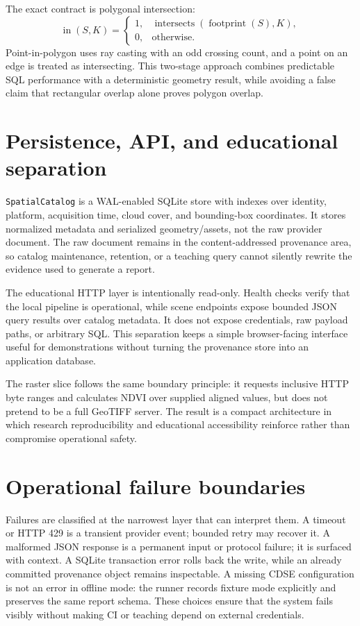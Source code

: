 The exact contract is polygonal intersection:
\[
\operatorname{in}(S,K)=
\begin{cases}
1,&\operatorname{intersects}(\operatorname{footprint}(S),K),\\
0,&\text{otherwise}.
\end{cases}
\]
Point-in-polygon uses ray casting with an odd crossing count, and a point on an edge is treated as
intersecting. This two-stage approach combines predictable SQL performance with a deterministic
geometry result, while avoiding a false claim that rectangular overlap alone proves polygon
overlap.

\section{Persistence, API, and educational separation}

\texttt{SpatialCatalog} is a WAL-enabled SQLite store with indexes over identity, platform,
acquisition time, cloud cover, and bounding-box coordinates. It stores normalized metadata and
serialized geometry/assets, not the raw provider document. The raw document remains in the
content-addressed provenance area, so catalog maintenance, retention, or a teaching query cannot
silently rewrite the evidence used to generate a report.

The educational HTTP layer is intentionally read-only. Health checks verify that the local
pipeline is operational, while scene endpoints expose bounded JSON query results over catalog
metadata. It does not expose credentials, raw payload paths, or arbitrary SQL. This separation
keeps a simple browser-facing interface useful for demonstrations without turning the provenance
store into an application database.

The raster slice follows the same boundary principle: it requests inclusive HTTP byte ranges and
calculates NDVI over supplied aligned values, but does not pretend to be a full GeoTIFF server.
The result is a compact architecture in which research reproducibility and educational
accessibility reinforce rather than compromise operational safety.

\section{Operational failure boundaries}

Failures are classified at the narrowest layer that can interpret them. A timeout or HTTP 429 is a
transient provider event; bounded retry may recover it. A malformed JSON response is a permanent
input or protocol failure; it is surfaced with context. A SQLite transaction error rolls back the
write, while an already committed provenance object remains inspectable. A missing CDSE
configuration is not an error in offline mode: the runner records fixture mode explicitly and
preserves the same report schema. These choices ensure that the system fails visibly without
making CI or teaching depend on external credentials.
